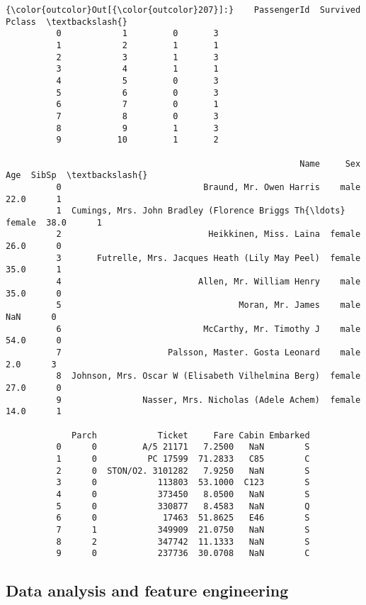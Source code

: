 \documentclass[11pt]{article}
\begin{document}
\begin{Verbatim}[commandchars=\\\{\}]
{\color{outcolor}Out[{\color{outcolor}207}]:}    PassengerId  Survived  Pclass  \textbackslash{}
          0            1         0       3   
          1            2         1       1   
          2            3         1       3   
          3            4         1       1   
          4            5         0       3   
          5            6         0       3   
          6            7         0       1   
          7            8         0       3   
          8            9         1       3   
          9           10         1       2   
          
                                                          Name     Sex   Age  SibSp  \textbackslash{}
          0                            Braund, Mr. Owen Harris    male  22.0      1   
          1  Cumings, Mrs. John Bradley (Florence Briggs Th{\ldots}  female  38.0      1   
          2                             Heikkinen, Miss. Laina  female  26.0      0   
          3       Futrelle, Mrs. Jacques Heath (Lily May Peel)  female  35.0      1   
          4                           Allen, Mr. William Henry    male  35.0      0   
          5                                   Moran, Mr. James    male   NaN      0   
          6                            McCarthy, Mr. Timothy J    male  54.0      0   
          7                     Palsson, Master. Gosta Leonard    male   2.0      3   
          8  Johnson, Mrs. Oscar W (Elisabeth Vilhelmina Berg)  female  27.0      0   
          9                Nasser, Mrs. Nicholas (Adele Achem)  female  14.0      1   
          
             Parch            Ticket     Fare Cabin Embarked  
          0      0         A/5 21171   7.2500   NaN        S  
          1      0          PC 17599  71.2833   C85        C  
          2      0  STON/O2. 3101282   7.9250   NaN        S  
          3      0            113803  53.1000  C123        S  
          4      0            373450   8.0500   NaN        S  
          5      0            330877   8.4583   NaN        Q  
          6      0             17463  51.8625   E46        S  
          7      1            349909  21.0750   NaN        S  
          8      2            347742  11.1333   NaN        S  
          9      0            237736  30.0708   NaN        C  
\end{Verbatim}
            
    \subsection{Data analysis and feature
engineering}\label{data-analysis-and-feature-engineering}
\end{document}
